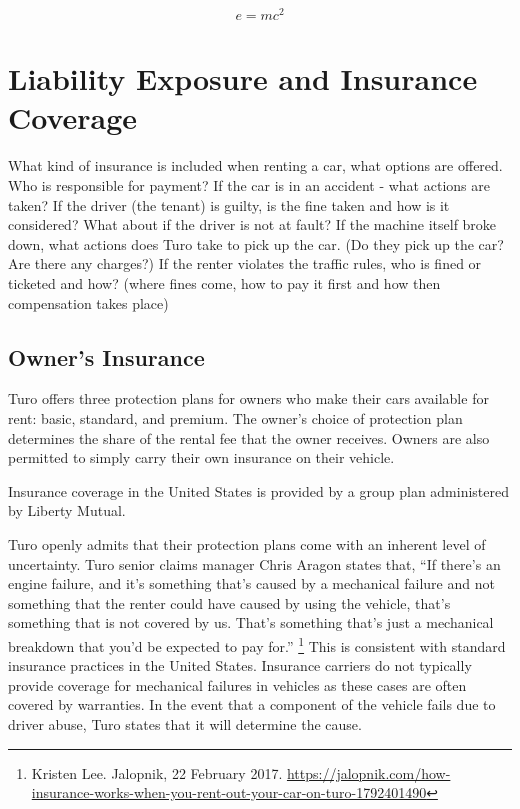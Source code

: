 \documentclass[preprint,12pt]{elsarticle}
\begin{document}
\begin{equation}
\label{eq:emc}
e = mc^2
\end{equation}

\section{Liability Exposure and Insurance Coverage}
\label{S:2}

What kind of insurance is included when renting a car, what options are offered. Who is responsible for payment?
If the car is in an accident - what actions are taken? If the driver (the tenant) is guilty, is the fine taken and how is it considered? What about if the driver is not at fault? If the machine itself broke down, what actions does Turo take to pick up the car. (Do they pick up the car? Are there any charges?)
If the renter violates the traffic rules, who is fined or ticketed and how? (where fines come, how to pay it first and how then compensation takes place)

\subsection{Owner's Insurance}
Turo offers three protection plans for owners who make their cars available for rent: basic, standard, and premium. The owner's choice of protection plan determines the share of the rental fee that the owner receives. Owners are also permitted to simply carry their own insurance on their vehicle.

Insurance coverage in the United States is provided by a group plan administered by Liberty Mutual.

Turo openly admits that their protection plans come with an inherent level of uncertainty. Turo senior claims manager Chris Aragon states that, ``If there’s an engine failure, and it’s something that’s caused by a mechanical failure and not something that the renter could have caused by using the vehicle, that’s something that is not covered by us. That’s something that’s just a mechanical breakdown that you’d be expected to pay for.''
  \footnote{
  Kristen Lee. Jalopnik, 22 February 2017. \url{https://jalopnik.com/how-insurance-works-when-you-rent-out-your-car-on-turo-1792401490}
  }
This is consistent with standard insurance practices in the United States. Insurance carriers do not typically provide coverage for mechanical failures in vehicles as these cases are often covered by warranties. In the event that a component of the vehicle fails due to driver abuse, Turo states that it will determine the cause.
\end{document}
